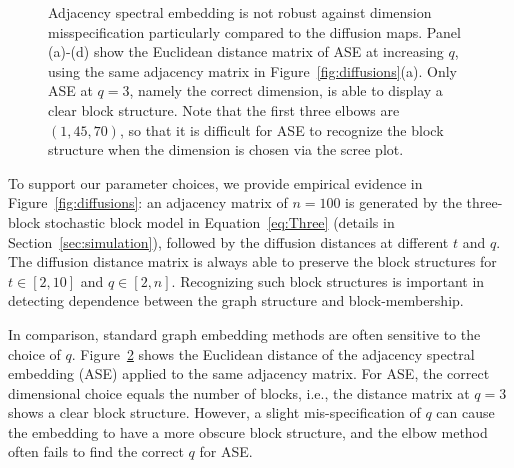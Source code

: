 \documentclass[12pt]{article}
\theoremstyle{definition}
\begin{document}
\begin{figure}[H]
\begin{subfigure}[b]{0.23\textwidth}
			\caption{}
			\label{fig:e99}
		\end{subfigure}
		\caption{Adjacency spectral embedding is not robust against dimension misspecification particularly compared to the diffusion maps. Panel (a)-(d) show the Euclidean distance matrix of ASE at increasing $q$, using the same adjacency matrix in Figure~\ref{fig:diffusions}(a). Only ASE at $q=3$, namely the correct dimension, is able to display a clear block structure. Note that the first three elbows are $(1,45,70)$, so that it is difficult for ASE to recognize the block structure when the dimension is chosen via the scree plot.}
		\label{fig:embedding}
	\end{figure}
	
	To support our parameter choices, we provide empirical evidence in Figure~\ref{fig:diffusions}: an adjacency matrix of $n=100$ is generated by the three-block stochastic block model in Equation~\ref{eq:Three} (details in Section~\ref{sec:simulation}), followed by the diffusion distances at different $t$ and $q$. The diffusion distance matrix is always able to preserve the block structures for $t \in [2,10]$ and $q \in [2,n]$. Recognizing such block structures is important in detecting dependence between the graph structure and block-membership.
	
	In comparison, standard graph embedding methods are often sensitive to the choice of $q$. Figure~\ref{fig:embedding} shows the Euclidean distance of the adjacency spectral embedding (ASE) \citep{SussmanEtAl2012} applied to the same adjacency matrix. For ASE, the correct dimensional choice equals the number of blocks, i.e., the distance matrix at $q=3$ shows a clear block structure. However, a slight mis-specification of $q$ can cause the embedding to have a more obscure block structure, and the elbow method often fails to find the correct $q$ for ASE.
	
\end{document}
